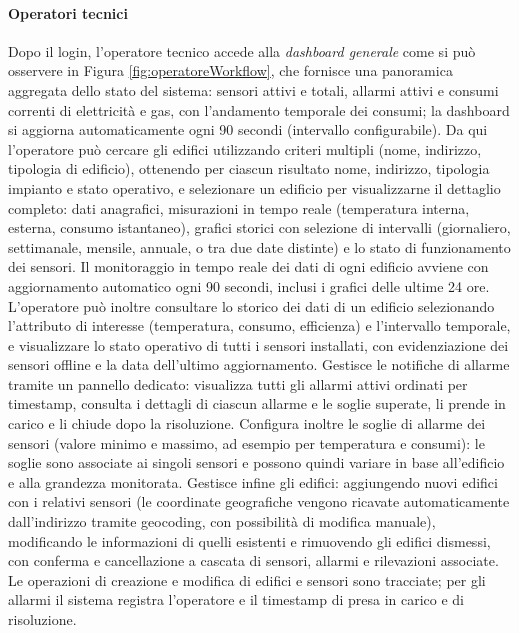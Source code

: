 \paragraph{Operatori tecnici}
Dopo il login, l'operatore tecnico accede alla \textit{dashboard generale} come si può osservere in Figura \ref{fig:operatoreWorkflow}, che fornisce una panoramica aggregata dello stato del sistema: sensori attivi e totali, allarmi attivi e consumi correnti di elettricità e gas, con l'andamento temporale dei consumi; la dashboard si aggiorna automaticamente ogni 90 secondi (intervallo configurabile). Da qui l'operatore può cercare gli edifici utilizzando criteri multipli (nome, indirizzo, tipologia di edificio), ottenendo per ciascun risultato nome, indirizzo, tipologia impianto e stato operativo, e selezionare un edificio per visualizzarne il dettaglio completo: dati anagrafici, misurazioni in tempo reale (temperatura interna, esterna, consumo istantaneo), grafici storici con selezione di intervalli (giornaliero, settimanale, mensile, annuale, o tra due date distinte) e lo stato di funzionamento dei sensori. Il monitoraggio in tempo reale dei dati di ogni edificio avviene con aggiornamento automatico ogni 90 secondi, inclusi i grafici delle ultime 24 ore. L'operatore può inoltre consultare lo storico dei dati di un edificio selezionando l'attributo di interesse (temperatura, consumo, efficienza) e l'intervallo temporale, e visualizzare lo stato operativo di tutti i sensori installati, con evidenziazione dei sensori offline e la data dell'ultimo aggiornamento. Gestisce le notifiche di allarme tramite un pannello dedicato: visualizza tutti gli allarmi attivi ordinati per timestamp, consulta i dettagli di ciascun allarme e le soglie superate, li prende in carico e li chiude dopo la risoluzione. Configura inoltre le soglie di allarme dei sensori (valore minimo e massimo, ad esempio per temperatura e consumi): le soglie sono associate ai singoli sensori e possono quindi variare in base all'edificio e alla grandezza monitorata. Gestisce infine gli edifici: aggiungendo nuovi edifici con i relativi sensori (le coordinate geografiche vengono ricavate automaticamente dall'indirizzo tramite geocoding, con possibilità di modifica manuale), modificando le informazioni di quelli esistenti e rimuovendo gli edifici dismessi, con conferma e cancellazione a cascata di sensori, allarmi e rilevazioni associate. Le operazioni di creazione e modifica di edifici e sensori sono tracciate; per gli allarmi il sistema registra l'operatore e il timestamp di presa in carico e di risoluzione.


